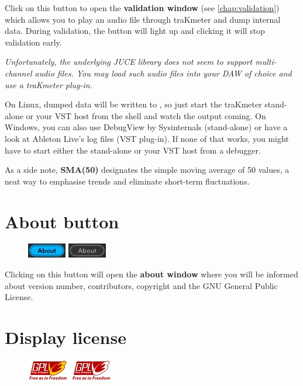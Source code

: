 Click on this button to open the \textbf{validation window} (see
\ref{chap:validation}) which allows you to play an audio file through
traKmeter and dump internal data.  During validation, the button will
light up and clicking it will stop validation early.

\emph{Unfortunately, the underlying JUCE library does not seem to
  support multi-channel audio files.  You may load such audio files
  into your DAW of choice and use a traKmeter plug-in.}

On Linux, dumped data will be written to , so just start
the traKmeter stand-alone or your VST host from the shell and watch
the output coming.  On Windows, you can also use DebugView by
Sysinternals (stand-alone) or have a look at Ableton Live's log files
(VST plug-in).  If none of that works, you might have to start either
the stand-alone or your VST host from a debugger.

As a side note, \textbf{SMA(50)} designates the simple moving average
of 50 values, a neat way to emphasise trends and eliminate short-term
fluctuations.

\section{About button}

\begin{figure}
\includegraphics[scale=\screenshotscale,clip]{include/images/button_about_on.png}
\newline \vspace{-0.9\baselineskip}
\includegraphics[scale=\screenshotscale,clip]{include/images/button_about_off.png}
\end{figure}

Clicking on this button will open the \textbf{about window} where you
will be informed about version number, contributors, copyright and the
GNU General Public License.

\section{Display license}

\begin{figure}
\includegraphics[scale=\screenshotscale,clip]{include/images/button_gpl_on.png}
\newline \vspace{-0.9\baselineskip}
\includegraphics[scale=\screenshotscale,clip]{include/images/button_gpl_off.png}
\end{figure}


